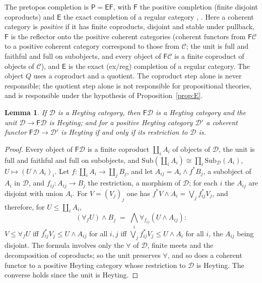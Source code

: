 \documentclass[11pt]{amsart}
\newtheorem{lem}[thm]{Lemma}
\theoremstyle{definition}
\newcommand{\Sub}{\mathrm{Sub}}
\newcommand{\FF}{\mathsf F}
\newcommand{\EE}{\mathsf E}
\newcommand{\PP}{\mathsf P}
\newcommand{\cC}{\mathcal C}
\newcommand{\cD}{\mathcal D}
\begin{document}
The pretopos completion is $\PP=\EE\FF$, with $\FF$ the positive
completion (finite disjoint coproducts) and $\EE$ the exact completion
of a regular category \cite[A3.3]{Elephant}, \cite{TheoryComp}. Here a coherent category is \emph{positive} if it has finite
coproducts, disjoint and stable under pullback, $\FF$ is the reflector
onto the positive coherent categories (coherent functors from $\FF\cC$
to a positive coherent category correspond to those from $\cC$; the
unit is full and faithful and full on subobjects, and every object of
$\FF\cC$ is a finite coproduct of objects of $\cC$), and $\EE$ is the
exact (ex/reg) completion of a regular category. The object $Q$ uses a
coproduct and a quotient. The coproduct step alone is never
responsible; the quotient step alone is not responsible for
propositional theories, and is responsible under the hypothesis of
Proposition~\ref{prop:E}.

\begin{lem}\label{lem:FHeyt}
If $\cD$ is a Heyting category, then $\FF\cD$ is a Heyting category and
the unit $\cD\to\FF\cD$ is Heyting; and for a positive Heyting category
$\cD'$ a coherent functor $\FF\cD\to\cD'$ is Heyting if and only if its
restriction to $\cD$ is.
\end{lem}
\begin{proof}
Every object of $\FF\cD$ is a finite coproduct $\coprod_iA_i$ of
objects of $\cD$, the unit is full and faithful and full on subobjects,
and $\Sub(\coprod_iA_i)\cong\prod_i\Sub_\cD(A_i)$, $U\mapsto(U\wedge
A_i)_i$. Let $f\colon\coprod_iA_i\to\coprod_jB_j$, and let
$A_{ij}=A_i\wedge f^*B_j$, a subobject of $A_i$ in $\cD$, and
$f_{ij}\colon A_{ij}\to B_j$ the restriction, a morphism of $\cD$; for
each $i$ the $A_{ij}$ are disjoint with union $A_i$. For
$V=(V_j)_j$ one has $f^*V\wedge A_i=\bigvee_jf_{ij}^*V_j$, and
therefore, for $U\le\coprod_iA_i$,
\[
(\forall_fU)\wedge B_j\;=\;\bigwedge_i\forall_{f_{ij}}(U\wedge A_{ij}):
\]
$V\le\forall_fU$ iff $f_{ij}^*V_j\le U\wedge A_{ij}$ for all $i,j$ iff
$\bigvee_jf_{ij}^*V_j\le U\wedge A_i$ for all $i$, the $A_{ij}$ being
disjoint. The formula involves only the $\forall$ of $\cD$, finite
meets and the decomposition of coproducts; so the unit preserves
$\forall$, and so does a coherent functor to a positive Heyting
category whose restriction to $\cD$ is Heyting. The converse holds
since the unit is Heyting.
\end{proof}
\end{document}
